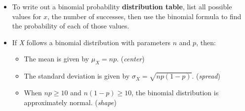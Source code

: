 \begin{itemize}
\item To write out a binomial probability \textbf{distribution table}, list all possible values for $x$, the number of successes, then use the binomial formula to find the probability of each of those values.  


\item If \textit{X} follows a binomial distribution with parameters $n$ and $p$, then:
\begin{itemize}\vspace{-1mm}
\setlength{\itemsep}{0mm}
\item The mean is given by $\mu_{\scriptscriptstyle{X}} = np$. \quad (\emph{center})
\item The standard deviation is given by $\sigma_{\scriptscriptstyle{X}} = \sqrt{np(1-p)}$. \quad (\emph{spread})
\item When $np\ge 10$ and $n(1-p)\ge 10$, the binomial distribution is approximately normal.  \quad (\emph{shape})
\end{itemize}

\end{itemize}


{}




\reviewchapterheader{}

